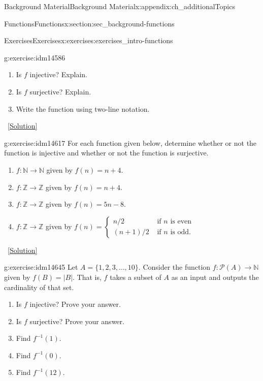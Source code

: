 \documentclass[oneside,10pt,]{book}
\numberwithin{equation}{chapter}
\def\N{\mathbb N}
\def\Z{\mathbb Z}
\def\pow{\mathcal P}
\def\inv{^{-1}}
\newcommand{\amp}{&}
\begin{document}
\begin{appendixptx}{Background Material}{}{Background Material}{}{}{x:appendix:ch_additionalTopics}
\begin{sectionptx}{Functions}{}{Functions}{}{}{x:section:sec_background-functions}
\begin{exercises-subsection}{Exercises}{}{Exercises}{}{}{x:exercises:exercises_intro-functions}
\begin{divisionexercise}{4}{}{}{g:exercise:idm14586}
\begin{sidebyside}{1}{0.3}{0.3}{0}
\begin{sbspanel}{0.4}
{
}%
\end{sbspanel}%
\end{sidebyside}%
\par
%
\begin{enumerate}[label=(\alph*)]
\item{}Is \(f\) injective? Explain.%
\item{}Is \(f\) surjective? Explain.%
\item{}Write the function using two-line notation.%
\end{enumerate}
%
\qquad~\hfill{\tiny\hyperlink{g:solution:idm14603-main}{[Solution]}}\end{divisionexercise}%
\begin{divisionexercise}{5}{}{}{g:exercise:idm14617}%
For each function given below, determine whether or not the function is injective and whether or not the function is surjective.%
\begin{enumerate}[label=(\alph*)]
\item{}\(f:\N \to \N\) given by \(f(n) = n+4\).%
\item{}\(f:\Z \to \Z\) given by \(f(n) = n+4\).%
\item{}\(f:\Z \to \Z\) given by \(f(n) = 5n - 8\).%
\item{}\(f:\Z \to \Z\) given by \(f(n) = \begin{cases}n/2 \amp  \text{ if } n \text{ is even} \\ (n+1)/2 \amp \text{ if } n \text{ is odd} . \end{cases}\)%
\end{enumerate}
%
\qquad~\hfill{\tiny\hyperlink{g:solution:idm14633-main}{[Solution]}}\end{divisionexercise}%
\begin{divisionexercise}{6}{}{}{g:exercise:idm14645}%
Let \(A = \{1,2,3,\ldots,10\}\). Consider the function \(f:\pow(A) \to \N\) given by \(f(B) = |B|\). That is, \(f\) takes a subset of \(A\) as an input and outputs the cardinality of that set.%
\begin{enumerate}[label=(\alph*)]
\item{}Is \(f\) injective? Prove your answer.%
\item{}Is \(f\) surjective? Prove your answer.%
\item{}Find \(f\inv(1)\).%
\item{}Find \(f\inv(0)\).%
\item{}Find \(f\inv(12)\).%

\end{enumerate}
\end{divisionexercise}
\end{exercises-subsection}
\end{sectionptx}
\end{appendixptx}
\end{document}
